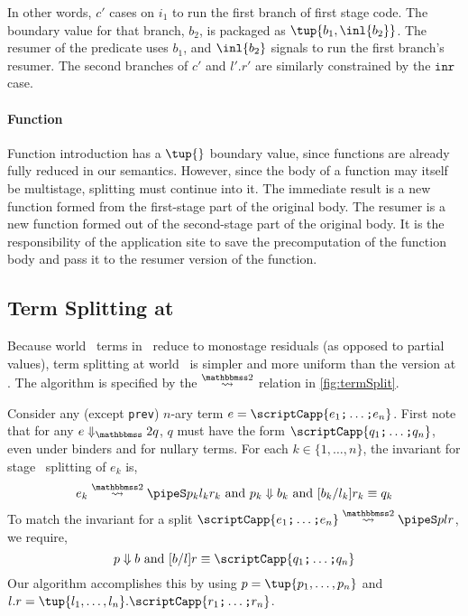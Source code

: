 \begin{abstrsyn}
In other words, $c'$ cases on $i_1$ to run the first branch of first stage
code. The boundary value for that branch, $b_2$, is packaged as $\tup {b_1, \inl
{b_2}}$. The resumer of the predicate uses $b_1$, and $\inl{b_2}$ signals to run
the first branch's resumer. The second branches of $c'$ and $l'.r'$ are
similarly constrained by the $\texttt{inr}$ case.


\paragraph {Function} 
Function introduction has a $\tup{}$ boundary value,
since functions are already fully reduced in our semantics.
However, since the body of a function may itself be multistage, splitting must continue into it.
The immediate result is a new function formed from the first-stage part of the original body.
The resumer is a new function formed out of the second-stage part of the original body.
It is the responsibility of the application site to save the precomputation of the function body
and pass it to the resumer version of the function.

\subsection{Term Splitting at \bbtwo}

Because world \bbtwo\ terms in \lang\ reduce to monostage residuals (as opposed to partial values),
term splitting at world \bbtwo\ is simpler and more uniform than the version at \bbonem. 
The algorithm is specified by the $\splittwosym$ relation in \cref{fig:termSplit}.

Consider any (except \texttt{prev}) 
$n$-ary term $e = \scriptCapp {e_1 \ttsemi \ldots \ttsemi e_n}$.
First note that for any $\diatwo e q$, $q$ must have the form $\scriptCapp {q_1 \ttsemi \ldots \ttsemi q_n}$,
even under binders and for nullary terms.
For each $k \in \{1,\ldots,n\}$, the invariant for stage \bbtwo\ splitting of $e_k$ is,
\[
	\splittwo {e_k} A {p_k} {l_k} {r_k} \text{ and } \reduce {p_k} {b_k} \text{ and } [{b_k}/{l_k}]{r_k} \equiv {q_k}
\]
To match the invariant for a split $\splittwo {\scriptCapp {e_1 \ttsemi \ldots \ttsemi e_n}} A p l r$, we require,
\[
	\reduce p b \text{ and } [b/l]r \equiv \scriptCapp {q_1 \ttsemi \ldots \ttsemi q_n}
\]
Our algorithm accomplishes this by using $p = \tup {p_1, \ldots, p_n}$ and
$l.r = \tup {l_1, \ldots, l_n}.\scriptCapp {r_1 \ttsemi \ldots \ttsemi r_n}$.


\end{abstrsyn}
